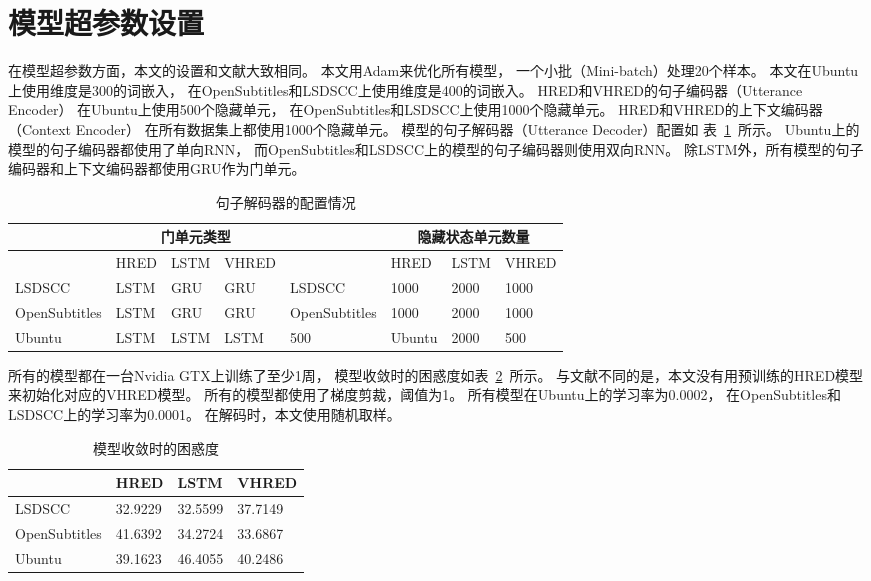 \section{模型超参数设置}\label{sec:model_hparams}
在模型超参数方面，本文的设置和文献\cite{VHRED}大致相同。
本文用Adam来优化所有模型，
一个小批（Mini-batch）处理20个样本。
本文在Ubuntu上使用维度是300的词嵌入，
在OpenSubtitles和LSDSCC上使用维度是400的词嵌入。
HRED和VHRED的句子编码器（Utterance Encoder）
在Ubuntu上使用500个隐藏单元，
在OpenSubtitles和LSDSCC上使用1000个隐藏单元。
HRED和VHRED的上下文编码器（Context Encoder）
在所有数据集上都使用1000个隐藏单元。
模型的句子解码器（Utterance Decoder）配置如
表~\ref{tab:utterance_decoder_config}~所示。
Ubuntu上的模型的句子编码器都使用了单向RNN，
而OpenSubtitles和LSDSCC上的模型的句子编码器则使用双向RNN。
除LSTM外，所有模型的句子编码器和上下文编码器都使用GRU作为门单元。
\begin{table}[H]
    \centering
    \caption{句子解码器的配置情况}
    \label{tab:utterance_decoder_config}
    \begin{tabular}{*{8}{l}}
        \toprule
        \midrule
        & \multicolumn{3}{c}{门单元类型} & & \multicolumn{3}{c}{隐藏状态单元数量} \\
        \midrule
        & HRED & LSTM & VHRED & & HRED & LSTM & VHRED \\
        \midrule
        LSDSCC & LSTM & GRU & GRU & LSDSCC & 1000 & 2000 & 1000 \\
        OpenSubtitles & LSTM & GRU & GRU & OpenSubtitles & 1000 & 2000 & 1000 \\
        Ubuntu & LSTM & LSTM & LSTM & 500 & Ubuntu & 2000 & 500 \\
        \bottomrule
    \end{tabular}
\end{table}

所有的模型都在一台Nvidia GTX上训练了至少1周，
模型收敛时的困惑度如表~\ref{tab:converged_perplexity}~所示。
与文献\cite{VHRED}不同的是，本文没有用预训练的HRED模型来初始化对应的VHRED模型。
所有的模型都使用了梯度剪裁，阈值为1。
所有模型在Ubuntu上的学习率为0.0002，
在OpenSubtitles和LSDSCC上的学习率为0.0001。
在解码时，本文使用随机取样。
\begin{table}
    \centering
    \caption{模型收敛时的困惑度}
    \label{tab:converged_perplexity}
    \begin{tabular}{llll}
        \toprule
        \midrule
        & HRED & LSTM & VHRED \\
        \midrule
        LSDSCC & 32.9229 & 32.5599 & 37.7149 \\
        OpenSubtitles & 41.6392 & 34.2724 & 33.6867 \\
        Ubuntu & 39.1623 & 46.4055 & 40.2486 \\
        \bottomrule
    \end{tabular}
\end{table}

